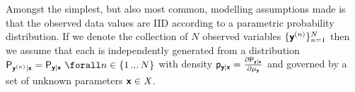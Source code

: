Amongst the simplest, but also most common, modelling assumptions made is that the observed data values are \ac{IID} according to a parametric probability distribution. If we denote the collection of $N$ observed variables $\lbrace \boldsymbol{\mathsf{y}}^{(n)} \rbrace_{n=1}^N$ then we assume that each is independently generated from a distribution $\prob{\rvct{y}^{(n)}|\rvct{x}} = \prob{\rvct{y}|\rvct{x}} ~\forall n \in \lbrace 1 \,...\,N\rbrace$ with density $\mathsf{p}_{\boldsymbol{\mathsf{y}}|\boldsymbol{\mathsf{x}}} = \frac{\partial \mathsf{P}_{\boldsymbol{\mathsf{y}}|\boldsymbol{\mathsf{x}}}}{\partial \mu_{\boldsymbol{\mathsf{y}}}}$ and governed by a set of unknown parameters $\boldsymbol{\mathsf{x}} \in \mathit{X}$. %

